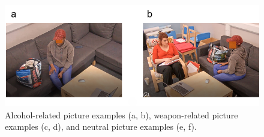 \documentclass[authordate, serif, review]{jote-article}
\begin{document}
\begin{figure}[H]
	\centering
	\includegraphics[scale=0.7]{media/image1.png}
	\caption{Alcohol-related picture examples (a, b), weapon-related picture examples (c, d), and neutral picture examples (e, f).}
\end{figure}
\newpage
\end{document}
